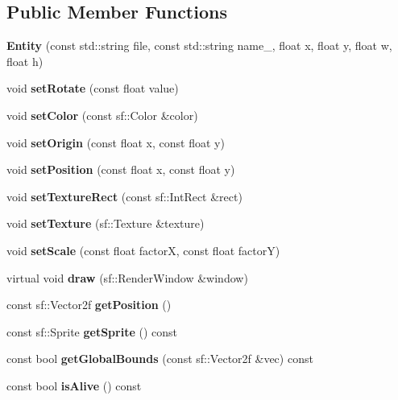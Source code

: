 \subsection*{Public Member Functions}
\begin{DoxyCompactItemize}
\item 
\mbox{\label{class_entity_adeafb102a65222ffe3f3764c80fb40be}} 
{\bfseries Entity} (const std\+::string file, const std\+::string name\+\_\+, float x, float y, float w, float h)
\item 
\mbox{\label{class_entity_a621c677db785136913ee34889f2f535b}} 
void {\bfseries set\+Rotate} (const float value)
\item 
\mbox{\label{class_entity_ac5987db2dd874b3df2428196513766e4}} 
void {\bfseries set\+Color} (const sf\+::\+Color \&color)
\item 
\mbox{\label{class_entity_ad42cfa8f3263d6fadd2b6546c4ac5459}} 
void {\bfseries set\+Origin} (const float x, const float y)
\item 
\mbox{\label{class_entity_ab634ca7ef80f912d4da76f341e28b241}} 
void {\bfseries set\+Position} (const float x, const float y)
\item 
\mbox{\label{class_entity_af879ce682a20c6c2d270ffd841cf7c26}} 
void {\bfseries set\+Texture\+Rect} (const sf\+::\+Int\+Rect \&rect)
\item 
\mbox{\label{class_entity_a0e2e68071fbe4490a619b4985e643d3b}} 
void {\bfseries set\+Texture} (sf\+::\+Texture \&texture)
\item 
\mbox{\label{class_entity_afd6064663f62605b34859eb9adc6b460}} 
void {\bfseries set\+Scale} (const float factorX, const float factorY)
\item 
\mbox{\label{class_entity_a1309341dd268af435449b5031ff0a06d}} 
virtual void {\bfseries draw} (sf\+::\+Render\+Window \&window)
\item 
\mbox{\label{class_entity_ad47c4683fbc9fb11e2712c7c6b8944c7}} 
const sf\+::\+Vector2f {\bfseries get\+Position} ()
\item 
\mbox{\label{class_entity_a15314da91491df7bca1940a3792799b7}} 
const sf\+::\+Sprite {\bfseries get\+Sprite} () const
\item 
\mbox{\label{class_entity_a1047dbb55741460c35c5f59b14420dda}} 
const bool {\bfseries get\+Global\+Bounds} (const sf\+::\+Vector2f \&vec) const
\item 
\mbox{\label{class_entity_adb4d323c82a9d425fecb4fddcff24b79}} 
const bool {\bfseries is\+Alive} () const
\end{DoxyCompactItemize}
